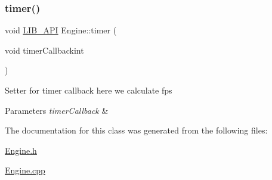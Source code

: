 \subsubsection{\texorpdfstring{timer()}{timer()}}
{\footnotesize\ttfamily void \hyperlink{Engine_8h_a77278c8cc96e39fb27b5d0a347c8fb3d}{L\+I\+B\+\_\+\+A\+PI} Engine\+::timer (\begin{DoxyParamCaption}\item[{void }]{timer\+Callbackint }\end{DoxyParamCaption})}

Setter for timer callback here we calculate fps 
\begin{DoxyParams}{Parameters}
{\em timer\+Callback} & \\
\hline
\end{DoxyParams}


The documentation for this class was generated from the following files\+:\begin{DoxyCompactItemize}
\item 
\hyperlink{Engine_8h}{Engine.\+h}\item 
\hyperlink{Engine_8cpp}{Engine.\+cpp}\end{DoxyCompactItemize}
